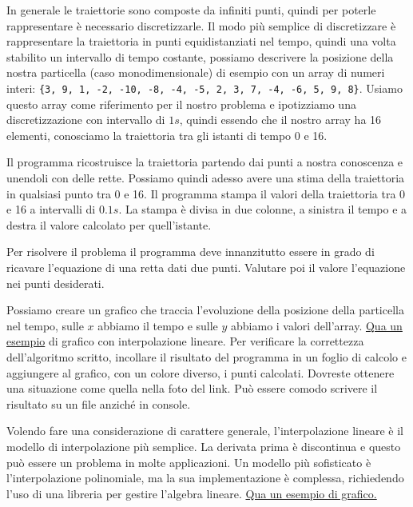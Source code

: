 \documentclass{article}
\begin{document}
In generale le traiettorie sono composte da infiniti punti, quindi per poterle rappresentare è necessario discretizzarle. Il modo più semplice di discretizzare è rappresentare la traiettoria in punti equidistanziati nel tempo, quindi una volta stabilito un intervallo di tempo costante, possiamo descrivere la posizione della nostra particella (caso monodimensionale) di esempio con un array di numeri interi: \texttt{\{3, 9, 1, -2, -10, -8, -4, -5, 2, 3, 7, -4, -6, 5, 9, 8\}}. Usiamo questo array come riferimento per il nostro problema e ipotizziamo una discretizzazione con intervallo di $1s$, quindi essendo che il nostro array ha 16 elementi, conosciamo la traiettoria tra gli istanti di tempo 0 e 16. 

Il programma ricostruisce la traiettoria partendo dai punti a nostra conoscenza e unendoli con delle rette. Possiamo quindi adesso avere una stima della traiettoria in qualsiasi punto tra 0 e 16. Il programma stampa il valori della traiettoria tra 0 e 16 a intervalli di $0.1s$. La stampa è divisa in due colonne, a sinistra il tempo e a destra il valore calcolato per quell'istante.  


\begin{info}
	Per risolvere il problema il programma deve innanzitutto essere in grado di ricavare l'equazione di una retta dati due punti. Valutare poi il valore l'equazione nei punti desiderati.
	
	Possiamo creare un grafico che traccia l'evoluzione della posizione della particella nel tempo, sulle $x$ abbiamo il tempo e sulle $y$ abbiamo i valori dell'array. \href{https://en.wikipedia.org/wiki/Linear_interpolation#/media/File:Interpolation_example_linear.svg}{Qua un esempio} di grafico con interpolazione lineare. Per verificare la correttezza dell'algoritmo scritto, incollare il risultato del programma in un foglio di calcolo e aggiungere al grafico, con un colore diverso, i punti calcolati. Dovreste ottenere una situazione come quella nella foto del link. Può essere comodo scrivere il risultato su un file anziché in console.
	
	Volendo fare una considerazione di carattere generale, l'interpolazione lineare è il modello di interpolazione più semplice. La derivata prima è discontinua e questo può essere un problema in molte applicazioni. Un modello più sofisticato è l'interpolazione polinomiale, ma la sua implementazione è complessa, richiedendo l'uso di una libreria per gestire l'algebra lineare. \href{https://en.wikipedia.org/wiki/Polynomial_interpolation#/media/File:Interpolation_example_polynomial.svg}{Qua un esempio di grafico.} 
\end{info}
\end{document}
